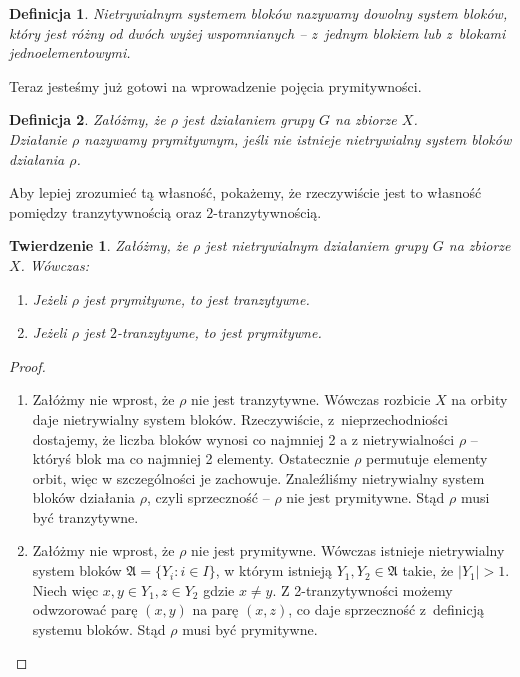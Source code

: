 \documentclass[licencjacka]{pracamgr}
\newtheorem{deff}{Definicja}[section]
\newtheorem{thh}{Twierdzenie}[section]
\begin{document}
\begin{deff}
    \emph{Nietrywialnym systemem bloków} nazywamy dowolny system bloków,
    który jest różny od dwóch wyżej wspomnianych -- z~jednym blokiem lub z~blokami jednoelementowymi.
\end{deff}

Teraz jesteśmy już gotowi na wprowadzenie pojęcia prymitywności.

\begin{deff}
    Załóżmy, że $\rho$ jest działaniem grupy $G$ na zbiorze $X$. \\
    Działanie \emph{$\rho$ nazywamy prymitywnym}, jeśli nie istnieje nietrywialny system bloków działania $\rho$.
\end{deff}

Aby lepiej zrozumieć tą własność, pokażemy, że rzeczywiście jest to
własność pomiędzy tranzytywnością oraz $2$-tranzytywnością.

\begin{thh}
    Załóżmy, że $\rho$ jest nietrywialnym działaniem grupy $G$ na zbiorze $X$. Wówczas:
    \begin{enumerate}[label=\alph*)]
     \item Jeżeli $\rho$ jest prymitywne, to jest tranzytywne.
     \item Jeżeli $\rho$ jest $2$-tranzytywne, to jest prymitywne.
    \end{enumerate}
\end{thh}

\begin{proof}%
    \begin{enumerate}[label=Ad \alph*)]
     \item  Załóżmy nie wprost, że $\rho$ nie jest tranzytywne.
                    Wówczas rozbicie $X$ na orbity daje nietrywialny system bloków.
                    Rzeczywiście, z~nieprzechodniości dostajemy, że liczba bloków wynosi co najmniej 2 a
                    z nietrywialności $\rho$ -- któryś blok ma co najmniej 2 elementy.
                    Ostatecznie $\rho$ permutuje elementy orbit, więc w szczególności je zachowuje.
                    Znaleźliśmy nietrywialny system bloków działania $\rho$, czyli sprzeczność -- $\rho$ nie jest prymitywne.
                    Stąd $\rho$ musi być tranzytywne.
     \item  Załóżmy nie wprost, że $\rho$ nie jest prymitywne.
                    Wówczas istnieje nietrywialny system bloków $\mathfrak{A} = \{Y_i \colon i \in I \}$,
                    w którym istnieją $Y_1, Y_2 \in \mathfrak{A}$ takie, że $|Y_1| > 1$.
                    Niech więc $x,y \in Y_1, z \in Y_2$ gdzie $x \ne y$.
                    Z 2-tranzytywności możemy odwzorować parę $(x, y)$ na parę $(x, z)$, co daje sprzeczność z~definicją systemu bloków.
                    Stąd $\rho$ musi być prymitywne.
    \end{enumerate}
\end{proof}
\end{document}
